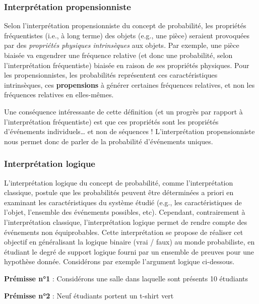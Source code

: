 \documentclass[
  a4paper,11pt,twoside,onecolumn,openright,final,oldfontcommands]{memoir}
\theoremstyle{definition}
\theoremstyle{definition}
\theoremstyle{definition}
\theoremstyle{definition}
\theoremstyle{remark}
\begin{document}
\hypertarget{interpruxe9tation-propensionniste}{%
\subsubsection{Interprétation propensionniste}\label{interpruxe9tation-propensionniste}}

Selon l'interprétation propensionniste du concept de probabilité, les propriétés fréquentistes (i.e., à long terme) des objets (e.g., une pièce) seraient provoquées par des \emph{propriétés physiques intrinsèques} aux objets. Par exemple, une pièce biaisée va engendrer une fréquence relative (et donc une probabilité, selon l'interprétation fréquentiste) biaisée en raison de ses propriétés physiques. Pour les propensionnistes, les probabilités représentent ces caractéristiques intrinsèques, ces \textbf{propensions} à générer certaines fréquences relatives, et non les fréquences relatives en elles-mêmes.

Une conséquence intéressante de cette définition (et un progrès par rapport à l'interprétation fréquentiste) est que ces propriétés sont les propriétés d'événements individuels\ldots{} et non de séquences ! L'interprétation propensionniste nous permet donc de parler de la probabilité d'événements uniques.

\hypertarget{interpruxe9tation-logique}{%
\subsubsection{Interprétation logique}\label{interpruxe9tation-logique}}

L'interprétation logique du concept de probabilité, comme l'interprétation classique, postule que les probabilités peuvent être déterminées a priori en examinant les caractéristiques du système étudié (e.g., les caractéristiques de l'objet, l'ensemble des événements possibles, etc). Cependant, contrairement à l'interprétation classique, l'interprétation logique permet de rendre compte des événements non équiprobables. Cette interprétation se propose de réaliser cet objectif en généralisant la logique binaire (vrai / faux) au monde probabiliste, en étudiant le degré de support logique fourni par un ensemble de preuves pour une hypothèse donnée. Considérons par exemple l'argument logique ci-dessous.

\textbf{Prémisse n°1} : Considérons une salle dans laquelle sont présents 10 étudiants

\textbf{Prémisse n°2} : Neuf étudiants portent un t-shirt vert
\end{document}
